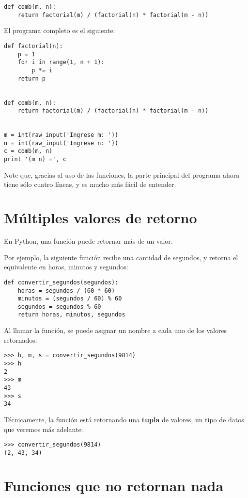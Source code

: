 \begin{lstlisting}
def comb(m, n):
    return factorial(m) / (factorial(n) * factorial(m - n))
\end{lstlisting}

El programa completo es el siguiente:
\begin{lstlisting}
def factorial(n):
    p = 1
    for i in range(1, n + 1):
        p *= i
    return p


def comb(m, n):
    return factorial(m) / (factorial(n) * factorial(m - n))


m = int(raw_input('Ingrese m: '))
n = int(raw_input('Ingrese n: '))
c = comb(m, n)
print '(m n) =', c
\end{lstlisting}



Note que, gracias al uso de las funciones, la parte principal del
programa ahora tiene sólo cuatro líneas, y es mucho más fácil de
entender.

\section{Múltiples valores de retorno}

En Python, una función puede retornar más de un valor.

Por ejemplo, la siguiente función recibe una cantidad de segundos, y
retorna el equivalente en horas, minutos y segundos:

\begin{lstlisting}
def convertir_segundos(segundos):
    horas = segundos / (60 * 60)
    minutos = (segundos / 60) % 60
    segundos = segundos % 60
    return horas, minutos, segundos
\end{lstlisting}

Al llamar la función, se puede asignar un nombre a cada uno de los
valores retornados:

\begin{lstlisting}
>>> h, m, s = convertir_segundos(9814)
>>> h
2
>>> m
43
>>> s
34
\end{lstlisting}

Técnicamente, la función está retornando una \textbf{tupla} de valores,
un tipo de datos que veremos más adelante:

\begin{lstlisting}
>>> convertir_segundos(9814)
(2, 43, 34)
\end{lstlisting}

\section{Funciones que no retornan nada}

